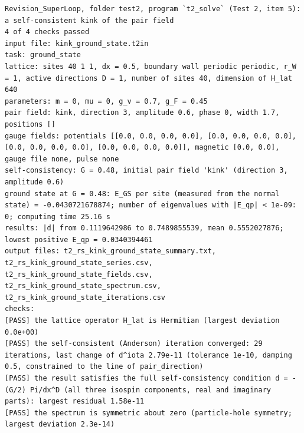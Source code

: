 \documentclass[
  10pt,
]{article}
\begin{document}
\begin{verbatim}
Revision_SuperLoop, folder test2, program `t2_solve` (Test 2, item 5): a self-consistent kink of the pair field
4 of 4 checks passed
input file: kink_ground_state.t2in
task: ground_state
lattice: sites 40 1 1, dx = 0.5, boundary wall periodic periodic, r_W = 1, active directions D = 1, number of sites 40, dimension of H_lat 640
parameters: m = 0, mu = 0, g_v = 0.7, g_F = 0.45
pair field: kink, direction 3, amplitude 0.6, phase 0, width 1.7, positions []
gauge fields: potentials [[0.0, 0.0, 0.0, 0.0], [0.0, 0.0, 0.0, 0.0], [0.0, 0.0, 0.0, 0.0], [0.0, 0.0, 0.0, 0.0]], magnetic [0.0, 0.0], gauge file none, pulse none
self-consistency: G = 0.48, initial pair field 'kink' (direction 3, amplitude 0.6)
ground state at G = 0.48: E_GS per site (measured from the normal state) = -0.0430721678874; number of eigenvalues with |E_qp| < 1e-09: 0; computing time 25.16 s
results: |d| from 0.1119642986 to 0.7489855539, mean 0.5552027876; lowest positive E_qp = 0.0340394461
output files: t2_rs_kink_ground_state_summary.txt, t2_rs_kink_ground_state_series.csv, t2_rs_kink_ground_state_fields.csv, t2_rs_kink_ground_state_spectrum.csv, t2_rs_kink_ground_state_iterations.csv
checks:
[PASS] the lattice operator H_lat is Hermitian (largest deviation 0.0e+00)
[PASS] the self-consistent (Anderson) iteration converged: 29 iterations, last change of d^iota 2.79e-11 (tolerance 1e-10, damping 0.5, constrained to the line of pair_direction)
[PASS] the result satisfies the full self-consistency condition d = -(G/2) Pi/dx^D (all three isospin components, real and imaginary parts): largest residual 1.58e-11
[PASS] the spectrum is symmetric about zero (particle-hole symmetry; largest deviation 2.3e-14)
\end{verbatim}
\end{document}
